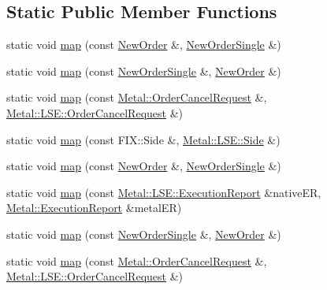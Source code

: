 \subsection*{Static Public Member Functions}
\begin{DoxyCompactItemize}
\item 
static void \hyperlink{classMetal_1_1LSE_1_1MilleniumMapper_a08f65c6357d8b450aff6335bf7dd4de8}{map} (const \hyperlink{classMetal_1_1LSE_1_1NewOrder}{New\+Order} \&, \hyperlink{classMetal_1_1NewOrderSingle}{New\+Order\+Single} \&)
\item 
static void \hyperlink{classMetal_1_1LSE_1_1MilleniumMapper_a83374c3bae042cd654f5f8b64d0584a2}{map} (const \hyperlink{classMetal_1_1NewOrderSingle}{New\+Order\+Single} \&, \hyperlink{classMetal_1_1LSE_1_1NewOrder}{New\+Order} \&)
\item 
static void \hyperlink{classMetal_1_1LSE_1_1MilleniumMapper_a21b4c1861b7c394ecae250baa685ab6d}{map} (const \hyperlink{classMetal_1_1OrderCancelRequest}{Metal\+::\+Order\+Cancel\+Request} \&, \hyperlink{classMetal_1_1LSE_1_1OrderCancelRequest}{Metal\+::\+L\+S\+E\+::\+Order\+Cancel\+Request} \&)
\item 
static void \hyperlink{classMetal_1_1LSE_1_1MilleniumMapper_a430f2f1f1f8dc53821e39ab90f6c78df}{map} (const F\+I\+X\+::\+Side \&, \hyperlink{namespaceMetal_1_1LSE_af5236b7a999484d8cd5b579b7d7c133b}{Metal\+::\+L\+S\+E\+::\+Side} \&)
\item 
static void \hyperlink{classMetal_1_1LSE_1_1MilleniumMapper_a240fb0861e36a68b6bab3c195409426e}{map} (const \hyperlink{classMetal_1_1LSE_1_1NewOrder}{New\+Order} \&, \hyperlink{classMetal_1_1NewOrderSingle}{New\+Order\+Single} \&)
\item 
static void \hyperlink{classMetal_1_1LSE_1_1MilleniumMapper_a389fb7455ec68406553118dde5efcdd1}{map} (const \hyperlink{classMetal_1_1LSE_1_1ExecutionReport}{Metal\+::\+L\+S\+E\+::\+Execution\+Report} \&native\+E\+R, \hyperlink{namespaceMetal_af4294c176f6aecf9f75e9b106b117aa1}{Metal\+::\+Execution\+Report} \&metal\+E\+R)
\item 
static void \hyperlink{classMetal_1_1LSE_1_1MilleniumMapper_a9b5461c4a7145d2d3a01c8bc080100b5}{map} (const \hyperlink{classMetal_1_1NewOrderSingle}{New\+Order\+Single} \&, \hyperlink{classMetal_1_1LSE_1_1NewOrder}{New\+Order} \&)
\item 
static void \hyperlink{classMetal_1_1LSE_1_1MilleniumMapper_adb39eee1d153e827125f07fa3c8e9081}{map} (const \hyperlink{classMetal_1_1OrderCancelRequest}{Metal\+::\+Order\+Cancel\+Request} \&, \hyperlink{classMetal_1_1LSE_1_1OrderCancelRequest}{Metal\+::\+L\+S\+E\+::\+Order\+Cancel\+Request} \&)

\end{DoxyCompactItemize}
